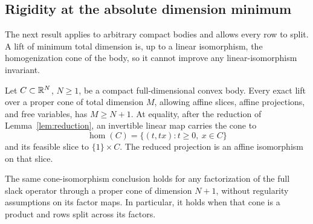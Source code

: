\subsection{Rigidity at the absolute dimension minimum}
The next result applies to arbitrary compact bodies and allows every
row to split. A lift of minimum total dimension is, up to a linear
isomorphism, the homogenization cone of the body, so it cannot improve
any linear-isomorphism invariant.

\begin{theorem}
\label{thm:minimal-dimension-rigidity}
Let $C\subset\mathbb R^N$, $N\geq1$, be a compact full-dimensional convex body.
Every exact lift over a proper cone of total dimension $M$, allowing
affine slices, affine projections, and free variables, has $M\geq N+1$.
At equality, after the reduction of Lemma~\ref{lem:reduction}, an
invertible linear map carries the cone to
\[
 \operatorname{hom}(C)=\{(t,tx):t\geq0,\ x\in C\}
\]
and its feasible slice to $\{1\}\times C$. The reduced projection is
an affine isomorphism on that slice.

The same cone-isomorphism conclusion holds for any factorization of
the full slack operator through a proper cone of dimension $N+1$,
without regularity assumptions on its factor maps. In particular, it
holds when that cone is a product and rows split across its factors.
\end{theorem}
